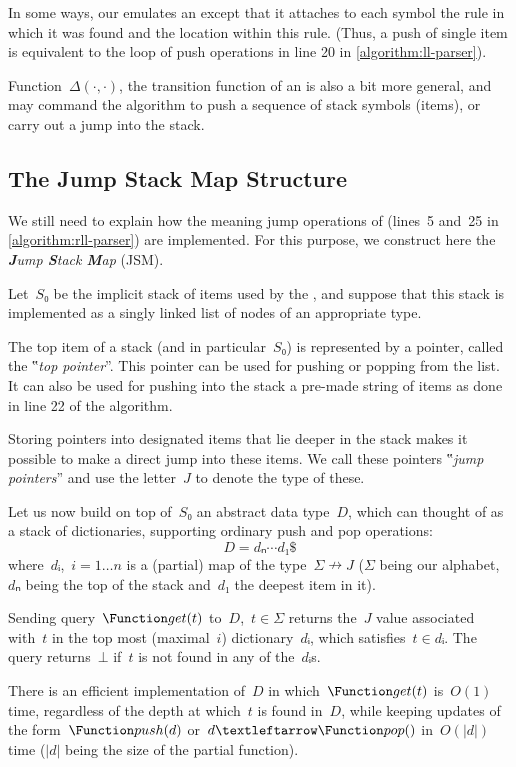 In some ways, our \RLLp emulates an \LLp except that it attaches to each symbol
the rule in which it was found and the location within this rule.
(Thus, a push of single item is equivalent to the loop of push operations in
line 20 in \cref{algorithm:ll-parser}).

Function~$Δ(·,·)$, the transition function of an \RLLp is also a bit more
general, and may command the algorithm to push a sequence of stack symbols
(items), or carry out a jump into the stack.

\subsection{The Jump Stack Map Structure}
\label{section:jump}
We still need to explain how the meaning jump operations of \RLLp (lines~5
and~25 in \cref{algorithm:rll-parser}) are implemented. For this purpose, we
construct here the \emph{\textbf Jump \textbf Stack \textbf Map} (JSM).

Let~$S₀$ be the implicit stack of items used by the \RLLp, and suppose that
this stack is implemented as a singly linked list of nodes of an appropriate
type.

The top item of a stack (and in particular~$S₀$) is represented by a pointer,
called the ‟\emph{top pointer}”. This pointer can be used for pushing or
popping from the list. It can also be used for pushing into the stack a
pre-made string of items as done in line 22 of the \RLLp algorithm.

Storing pointers into designated items that lie deeper in the stack makes it
possible to make a direct jump into these items. We call these pointers
‟\emph{jump pointers}” and use the letter~$J$ to denote the type of these.

Let us now build on top of~$S₀$ an abstract data type~$D$, which can thought of
as a stack of dictionaries, supporting ordinary push and pop operations:
\[
  D=dₙ⋯d₁\$
\]
where~$dᵢ$,~$i=1…n$ is a (partial) map of the type~$Σ↛J$ ($Σ$ being our
alphabet,~$dₙ$ being the top of the stack and~$d₁$ the deepest item in it).

Sending query~$\Function get(t)$ to~$D$,~$t∈Σ$ returns the~$J$ value
associated with~$t$ in the top most (maximal~$i$) dictionary~$dᵢ$, which
satisfies~$t∈dᵢ$. The query returns~$⊥$ if~$t$ is not found in any of
the~$dᵢ$s.

There is an efficient implementation of~$D$ in which~$\Function get(t)$
is~$O(1)$ time, regardless of the depth at which~$t$ is found in~$D$, while
keeping updates of the form~$\Function push(d)$ or~$d←\Function pop()$
in~$O(|d|)$ time ($|d|$ being the size of the partial function).

